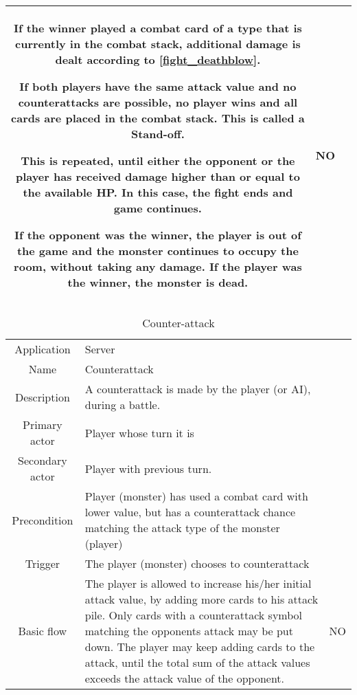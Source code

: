 \documentclass[a4paper,10pt]{report}
\begin{document}
\begin{table}
\begin{tabular}{|c| p{9cm}|c}
If the winner played a combat card of a type that is currently in the combat stack, additional damage is dealt according to \ref{fight_deathblow}.

If both players have the same attack value and no counterattacks are possible, no player wins and all cards are placed in the combat stack. This is called a Stand-off.

This is repeated, until either the opponent or the player has received damage higher than or equal to the available HP. In this case, the fight ends and game continues.

If the opponent was the winner, the player is out of the game and the monster continues to occupy the room, without taking any damage. If the player was the winner, the monster is dead.

& NO \\



\hline
\end{tabular}
\end{table}

\begin{table}
\caption{Counter-attack}
\label{fight_counterattack}
\begin{tabular}{|c| p{9cm}|c}
\hline
Application & Server & \\
Name & Counterattack & \\
Description & A counterattack is made by the player (or AI), during a battle. & \\
Primary actor & Player whose turn it is & \\
Secondary actor & Player with previous turn.& \\
Precondition & Player (monster) has used a combat card with lower value, but has a counterattack chance matching the attack type of the monster (player)& \\
Trigger & The player (monster) chooses to counterattack  & \\ \hline
Basic flow & The player is allowed to increase his/her initial attack value, by adding more cards to his attack pile. Only cards with a counterattack symbol matching the opponents attack may be put down. The player may keep adding cards to the attack, until the total sum of the attack values exceeds the attack value of the opponent.& NO\\
\hline
\end{tabular}
\end{table}
\end{document}
